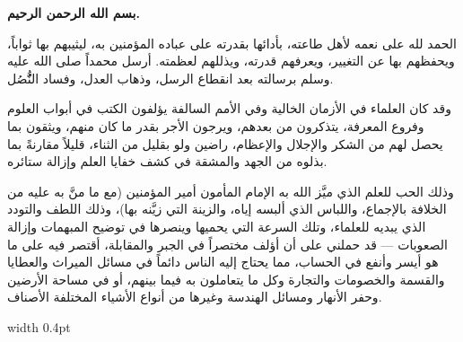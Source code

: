 \documentclass[11pt,a4paper]{book}
\begin{document}
\noindent\begin{minipage}[t]{0.48\textwidth}
\raggedleft

\begin{Arabic}
\textbf{بسم الله الرحمن الرحيم.}

الحمد لله على نعمه لأهل طاعته، بأدائها بقدرته على عباده المؤمنين به، ليثيبهم بها ثواباً، ويحفظهم بها عن التغيير، ويعرفهم قدرته، ويذللهم لعظمته. أرسل محمداً صلى الله عليه وسلم برسالته بعد انقطاع الرسل، وذهاب العدل، وفساد النُُّصُل.

وقد كان العلماء في الأزمان الخالية وفي الأمم السالفة يؤلفون الكتب في أبواب العلوم وفروع المعرفة، يتذكرون من بعدهم، ويرجون الأجر بقدر ما كان منهم، ويثقون بما يحصل لهم من الشكر والإجلال والإعظام، راضين ولو بقليل من الثناء، قليلاً مقارنةً بما بذلوه من الجهد والمشقة في كشف خفايا العلم وإزالة ستائره.

وذلك الحب للعلم الذي ميَّز الله به الإمام المأمون أمير المؤمنين (مع ما منَّ به عليه من الخلافة بالإجماع، واللباس الذي ألبسه إياه، والزينة التي زيَّنه بها)، وذلك اللطف والتودد الذي يبديه للعلماء، وتلك السرعة التي يحميها وينصرها في توضيح المبهمات وإزالة الصعوبات — قد حملني على أن أؤلف مختصراً في الجبر والمقابلة، أقتصر فيه على ما هو أيسر وأنفع في الحساب، مما يحتاج إليه الناس دائماً في مسائل الميراث والعطايا والقسمة والخصومات والتجارة وكل ما يتعاملون به فيما بينهم، أو في مساحة الأرضين وحفر الأنهار ومسائل الهندسة وغيرها من أنواع الأشياء المختلفة الأصناف.
\end{Arabic}

\end{minipage}%
\hfill\vrule width 0.4pt\hfill
\end{document}
